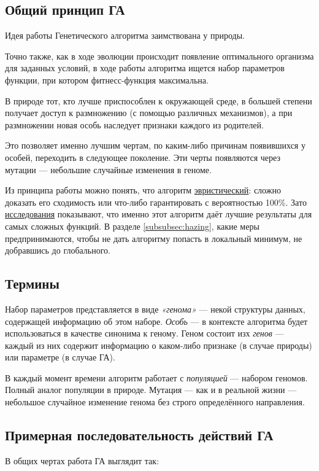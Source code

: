 \subsection{Общий принцип ГА}\label{subsec:ga_general_principles}
Идея работы Генетического алгоритма заимствована у природы.

Точно также, как в ходе эволюции происходит появление оптимального организма для заданных условий,
в ходе работы алгоритма ищется набор параметров функции, при котором фитнесс-функция максимальна.

В природе тот, кто лучше приспособлен к окружающей среде, в большей степени получает доступ к размножению (с помощью различных механизмов),
а при размножении новая особь наследует признаки каждого из родителей.

Это позволяет именно лучшим чертам, по каким-либо причинам появившихся у особей, переходить в следующее поколение.
Эти черты появляются через мутации — небольшие случайные изменения в геноме.

Из принципа работы можно понять, что алгоритм \href{https://en.wikipedia.org/wiki/Heuristic_(computer_science)}{эвристический}: сложно доказать его сходимость или что-либо гарантировать с вероятностью 100\%.
Зато \href{talgat.org/news/wp-content/uploads/2018/08/112.pdf}{исследования} показывают, что именно этот алгоритм даёт лучшие результаты для самых сложных функций.
В разделе \ref{subsubsec:hazing}, какие меры предпринимаются, чтобы не дать алгоритму попасть в локальный минимум, не добравшись до глобального.

\subsection{Термины}\label{subsec:ga_principles}
Набор параметров представляется в виде \textit{«генома»} — некой структуры данных, содержащей информацию об этом наборе.
\textit{Особь} — в контексте алгоритма будет использоваться в качестве синонима к геному.
Геном состоит изх \textit{генов} — каждый из них содержит информацию о каком-либо признаке (в случае природы) или параметре (в случае ГА).

В каждый момент времени алгоритм работает с \textit{популяцией} — набором геномов. Полный аналог популяции в природе.
Мутация — как и в реальной жизни — небольшое случайное изменение генома без строго определённого направления.

\subsection{Примерная последовательность действий ГА}\label{subsec:approx_ga_algo}
В общих чертах работа ГА выглядит так:

